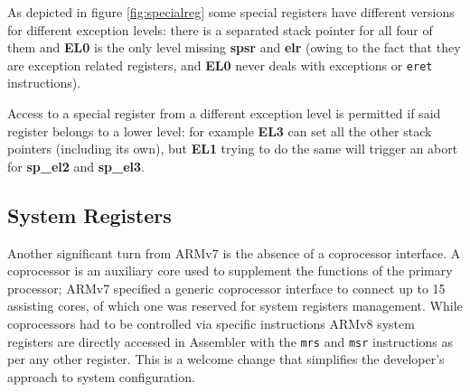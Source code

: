\documentclass[12pt,a4paper,openright,twoside]{report}
\begin{document}
As depicted in figure \ref{fig:specialreg} some special registers have different
versions for different exception levels: there is a separated stack pointer 
for all four of them and \textbf{EL0} is the only level missing \textbf{spsr}
and \textbf{elr} (owing to the fact that they are exception related registers, and
\textbf{EL0} never deals with exceptions or {\tt eret} instructions).

Access to a special register from a different exception level is permitted if 
said register belongs to a lower level: for example \textbf{EL3} can set all the
other stack pointers (including its own), but \textbf{EL1} trying 
to do the same will trigger an abort for \textbf{sp\_el2} and \textbf{sp\_el3}.

\subsection{System Registers}
Another significant turn from ARMv7 is the absence of a coprocessor interface.
A coprocessor is an auxiliary core used to supplement the functions of the primary
processor; ARMv7 specified a generic coprocessor interface to connect up to 
15 assisting cores, of which one was reserved for system registers management.
While coprocessors had to be controlled via specific instructions ARMv8 system registers
are directly accessed in Assembler with the {\tt mrs} and {\tt msr} instructions
as per any other register. This is a welcome change that simplifies the developer's
approach to system configuration.
\end{document}
